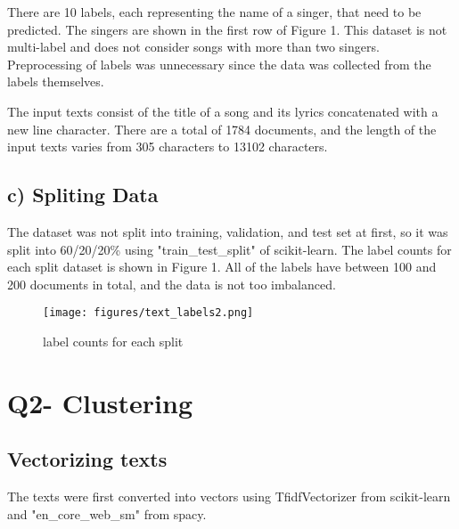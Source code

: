 \documentclass[a4paper,11pt]{article}
\begin{document}
There are 10 labels, each representing the name of a singer, that need to be predicted.
The singers are shown in the first row of Figure 1.
This dataset is not multi-label and does not consider songs with more than two singers.
Preprocessing of labels was unnecessary since the data was collected from the labels themselves.

The input texts consist of the title of a song and its lyrics concatenated with a new line character.
There are a total of 1784 documents, and the length of the input texts varies from 305 characters to 13102 characters.



\subsection{c) Spliting Data}
The dataset was not split into training, validation, and test set at first, 
so it was split into 60/20/20\% using "train\_test\_split" of scikit-learn.
The label counts for each split dataset is shown in Figure 1.
All of the labels have between 100 and 200 documents in total, and the data is not too imbalanced.

\begin{figure}[htbp]
  \begin{center}
  \texttt{[image: figures/text\_labels2.png]}
  \caption{label counts for each split}
  \end{center}
\end{figure}

\section{Q2- Clustering}
\subsection{Vectorizing texts}
The texts were first converted into vectors using TfidfVectorizer from scikit-learn and "en\_core\_web\_sm" from spacy.
\end{document}
